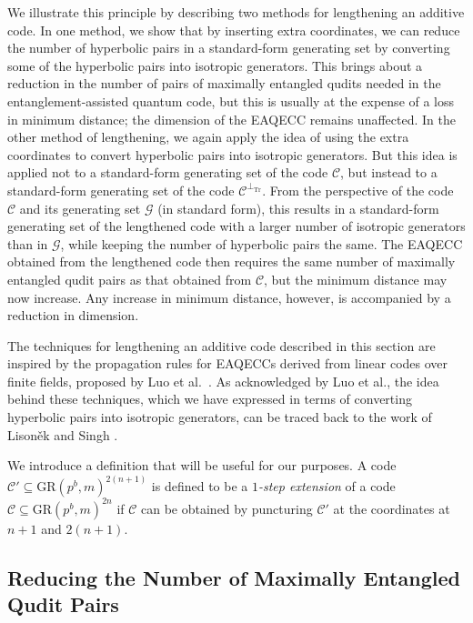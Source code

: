 \documentclass{article}
\DeclareMathOperator{\Tr}{Tr}
\theoremstyle{remark}
\theoremstyle{definition}
\numberwithin{equation}{section}
\begin{document}
We illustrate this principle by describing two methods for lengthening an additive code. In one method, we show that by inserting extra coordinates, we can reduce the number of hyperbolic pairs in a standard-form generating set by converting some of the hyperbolic pairs into isotropic generators. This brings about a reduction in the number of pairs of maximally entangled qudits needed in the entanglement-assisted quantum code, but this is usually at the expense of a loss in minimum distance; the dimension of the EAQECC remains unaffected. In the other method of lengthening, we again apply the idea of using the extra coordinates to convert hyperbolic pairs into isotropic generators. But this idea is applied not to a standard-form generating set of the code $\mathcal{C}$, but instead to a standard-form generating set of the code $\mathcal{C}^{\perp_{\Tr}}$. From the perspective of the code $\mathcal{C}$ and its generating set $\mathcal{G}$ (in standard form), this results in a standard-form generating set of the lengthened code with a larger number of isotropic generators than in $\mathcal{G}$, while keeping the number of hyperbolic pairs the same. The EAQECC obtained from the lengthened code then requires the same number of maximally entangled qudit pairs as that obtained from $\mathcal{C}$, but the minimum distance may now increase. Any increase in minimum distance, however, is accompanied by a reduction in dimension. 

The techniques for lengthening an additive code described in this section are inspired by the propagation rules for EAQECCs derived from linear codes over finite fields, proposed by Luo et al.\ \cite[Theorems 16 and 18]{luo1}. As acknowledged by Luo et al., the idea behind these techniques, which we have expressed in terms of converting hyperbolic pairs into isotropic generators, can be traced back to the work of Lison\v{e}k and Singh \cite{liso}.

We introduce a definition that will be useful for our purposes. A code $\mathcal{C}' \subseteq \text{GR}(p^b,m)^{2(n+1)}$ is defined to be a \emph{$1$-step extension} of a code $\mathcal{C} \subseteq \text{GR}(p^b,m)^{2n}$ if $\mathcal{C}$ can be obtained by puncturing $\mathcal{C}'$ at the coordinates at $n+1$ and $2(n+1)$.

\subsection{Reducing the Number of Maximally Entangled Qudit Pairs}\label{subsec:less}
\end{document}
